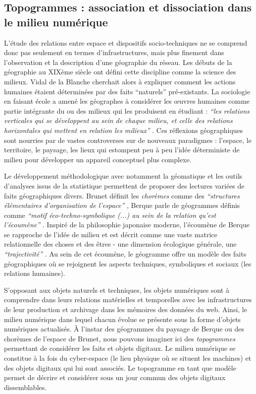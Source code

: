\subsection[Topogrammes : association et dissociation dans le milieu numérique]{Topogrammes : association et dissociation dans le milieu numérique}

L’étude des relations entre espace et dispositifs socio-techniques ne se comprend donc pas seulement en termes d’infrastructures, mais plus finement dans l’observation et la description d’une géographie du réseau. Les débuts de la géographie au XIXème siècle ont défini cette discipline comme la science des milieux. Vidal de la Blanche cherchait alors à expliquer comment les actions humaines étaient déterminées par des faits ``naturels'' pré-existants. La sociologie en faisant école a amené les géographes à considérer les œuvres humaines comme partie intégrante du ou des milieux qui les produisent \citep{Demangeot1984} en étudiant : \textit{``les relations verticales qui se développent au sein de chaque milieu, et celle des relations horizontales qui mettent en relation les milieux''} \citep{Claval1990}. Ces réflexions géographiques sont nourries par de vastes controverses sur de nouveaux paradigmes : l'espace, le territoire, le paysage, les lieux qui estompent peu à peu l’idée déterministe de milieu pour développer un appareil conceptuel plus complexe. 

Le développement méthodologique avec notamment la géomatique et les outils d’analyses issus de la statistique permettent de proposer des lectures variées de faits géographiques divers. Brunet définit les \textit{chorèmes} comme des \textit{``structures élémentaires d'organisation de l'espace''} \citep{Brunet1980}, Berque parle de géogrammes définis comme \textit{``motif éco-techno-symbolique (...) au sein de la relation qu'est l'écoumène''} \citep{Berque1999}. Inspiré de la philosophie japonaise moderne, l’écoumène de Berque se rapproche de l’idée de milieu et est décrit comme une vaste matrice relationnelle des choses et des êtres - une dimension écologique générale, une \textit{``trajectivité''} \citep{Watsuji2011}. Au sein de cet écoumène, le géogramme offre un modèle des faits géographiques où se rejoignent les aspects techniques, symboliques et sociaux (les relations humaines). 

S’opposant aux objets naturels et techniques, les objets numériques sont à comprendre dans leurs relations matérielles et temporelles avec les infrastructures de leur production et archivage dans les mémoires des données du web. Ainsi, le milieu numérique dans lequel chacun évolue se présente sous la forme d’objets numériques actualisés. À l’instar des géogrammes du paysage de Berque ou des chorèmes de l’espace de Brunet, nous pouvons imaginer ici des \textit{topogrammes} permettant de considérer les faits et objets digitaux. Le milieu numérique se constitue à la fois du cyber-espace (le lieu physique où se situent les machines) et des objets digitaux qui lui sont associés. Le topogramme en tant que modèle permet de décrire et considérer sous un jour commun des objets digitaux dissemblables.

